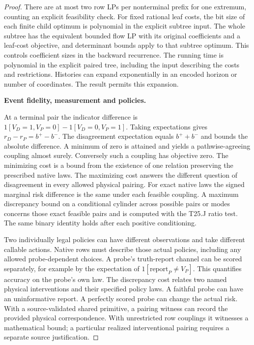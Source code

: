 \begin{proof}
There are at most two row LPs per nonterminal prefix for one extremum, counting an explicit feasibility check. For fixed rational leaf costs, the bit size of each finite child optimum is polynomial in the explicit subtree input. The whole subtree has the equivalent bounded flow LP with its original coefficients and a leaf-cost objective, and determinant bounds apply to that subtree optimum. This controls coefficient sizes in the backward recurrence. The running time is polynomial in the explicit paired tree, including the input describing the costs and restrictions. Histories can expand exponentially in an encoded horizon or number of coordinates. The result permits this expansion.

\textbf{Event fidelity, measurement and policies.}

At a terminal pair the indicator difference is \(1[V_D=1,V_P=0]-1[V_D=0,V_P=1]\). Taking expectations gives \(r_D-r_P=b^+-b^-\). The disagreement expectation equals \(b^++b^-\) and bounds the absolute difference. A minimum of zero is attained and yields a pathwise-agreeing coupling almost surely. Conversely such a coupling has objective zero. The minimizing cost is a bound from the existence of one relation preserving the prescribed native laws. The maximizing cost answers the different question of disagreement in every allowed physical pairing. For exact native laws the signed marginal risk difference is the same under each feasible coupling. A maximum discrepancy bound on a conditional cylinder across possible pairs or modes concerns those exact feasible pairs and is computed with the T25.J ratio test. The same binary identity holds after each positive conditioning.

Two individually legal policies can have different observations and take different callable actions. Native rows must describe those actual policies, including any allowed probe-dependent choices. A probe's truth-report channel can be scored separately, for example by the expectation of \(1[\mathrm{report}_P\ne V_P]\). This quantifies accuracy on the probe's own law. The discrepancy cost relates two named physical interventions and their specified policy laws. A faithful probe can have an uninformative report. A perfectly scored probe can change the actual risk. With a source-validated shared primitive, a pairing witness can record the provided physical correspondence. With unrestricted row couplings it witnesses a mathematical bound; a particular realized interventional pairing requires a separate source justification.


\end{proof}
